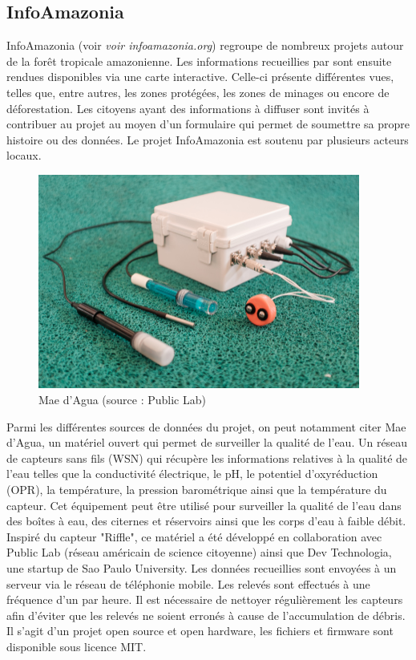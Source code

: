 \documentclass[10pt, article]{llncs}
\begin{document}
	\subsection{InfoAmazonia}
		InfoAmazonia (voir \textit{voir infoamazonia.org}) regroupe de nombreux projets autour de la forêt tropicale amazonienne. Les informations recueillies par sont ensuite rendues disponibles via une carte interactive. Celle-ci présente différentes vues, telles que, entre autres, les zones protégées, les zones de minages ou encore de déforestation. Les citoyens ayant des informations à diffuser sont invités à contribuer au projet au moyen d'un formulaire qui permet de soumettre sa propre histoire ou des données. Le projet InfoAmazonia est soutenu par plusieurs acteurs locaux.\\
		\begin{figure}
			\begin{center}
				\includegraphics[width=300pt]{img/mae-dagua.jpg}
			\end{center}
			\caption{Mae d'Agua (source : Public Lab)}
		\end{figure}
		Parmi les différentes sources de données du projet, on peut notamment citer Mae d'Agua, un matériel ouvert qui permet de surveiller la qualité de l'eau. Un réseau de capteurs sans fils (WSN) qui récupère les informations relatives à la qualité de l'eau telles que la conductivité électrique, le pH, le potentiel d'oxyréduction (OPR), la température, la pression barométrique ainsi que la température du capteur. Cet équipement peut être utilisé pour surveiller la qualité de l'eau dans des boîtes à eau, des citernes et réservoirs ainsi que les corps d'eau à faible débit. Inspiré du capteur "Riffle", ce matériel a été développé en collaboration avec Public Lab (réseau américain de science citoyenne) ainsi que Dev Technologia, une startup de Sao Paulo University. Les données recueillies sont envoyées à un serveur via le réseau de téléphonie mobile. Les relevés sont effectués à une fréquence d'un par heure. Il est nécessaire de nettoyer régulièrement les capteurs afin d'éviter que les relevés ne soient erronés à cause de l'accumulation de débris. Il s'agit d'un projet open source et open hardware, les fichiers et firmware sont disponible sous licence MIT. \\
\end{document}
